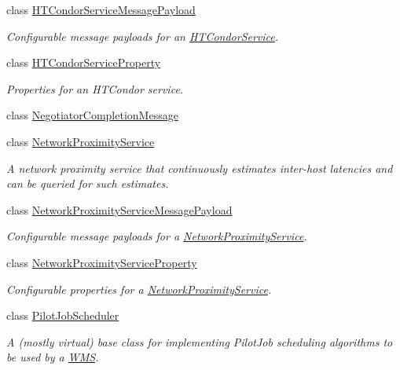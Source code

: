 \begin{DoxyCompactItemize}
class \hyperlink{classwrench_1_1_h_t_condor_service_message_payload}{H\+T\+Condor\+Service\+Message\+Payload}
\begin{DoxyCompactList}\small\item\em Configurable message payloads for an \hyperlink{classwrench_1_1_h_t_condor_service}{H\+T\+Condor\+Service}. \end{DoxyCompactList}\item 
class \hyperlink{classwrench_1_1_h_t_condor_service_property}{H\+T\+Condor\+Service\+Property}
\begin{DoxyCompactList}\small\item\em Properties for an H\+T\+Condor service. \end{DoxyCompactList}\item 
class \hyperlink{classwrench_1_1_negotiator_completion_message}{Negotiator\+Completion\+Message}
\item 
class \hyperlink{classwrench_1_1_network_proximity_service}{Network\+Proximity\+Service}
\begin{DoxyCompactList}\small\item\em A network proximity service that continuously estimates inter-\/host latencies and can be queried for such estimates. \end{DoxyCompactList}\item 
class \hyperlink{classwrench_1_1_network_proximity_service_message_payload}{Network\+Proximity\+Service\+Message\+Payload}
\begin{DoxyCompactList}\small\item\em Configurable message payloads for a \hyperlink{classwrench_1_1_network_proximity_service}{Network\+Proximity\+Service}. \end{DoxyCompactList}\item 
class \hyperlink{classwrench_1_1_network_proximity_service_property}{Network\+Proximity\+Service\+Property}
\begin{DoxyCompactList}\small\item\em Configurable properties for a \hyperlink{classwrench_1_1_network_proximity_service}{Network\+Proximity\+Service}. \end{DoxyCompactList}\item 
class \hyperlink{classwrench_1_1_pilot_job_scheduler}{Pilot\+Job\+Scheduler}
\begin{DoxyCompactList}\small\item\em A (mostly virtual) base class for implementing Pilot\+Job scheduling algorithms to be used by a \hyperlink{classwrench_1_1_w_m_s}{W\+MS}. \end{DoxyCompactList}\item 

\end{DoxyCompactItemize}
